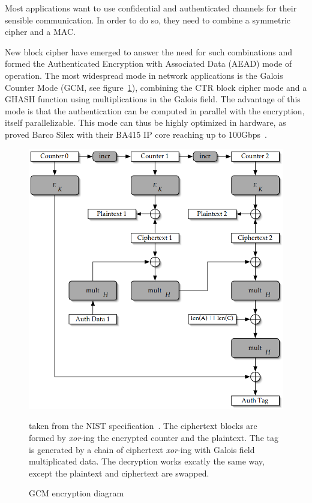 Most applications want to use confidential and authenticated channels for their sensible communication.
In order to do so, they need to combine a symmetric cipher and a MAC.

\noindent New block cipher have emerged to answer the need for such combinations and formed the Authenticated Encryption with Associated Data (AEAD) mode of operation.
The most widespread mode in network applications is the Galois Counter Mode (GCM, see figure~\ref{fig:gcm-encrypt}), combining the CTR block cipher mode and a GHASH function using multiplications in the Galois field.
The advantage of this mode is that the authentication can be computed in parallel with the encryption, itself parallelizable.
This mode can thus be highly optimized in hardware, as proved Barco Silex with their BA415 IP core reaching up to 100Gbps~\cite{barco-ba415}.

\begin{figure}
\includegraphics[width=\textwidth]{nist-gcm-encrypt}
\caption{GCM encryption diagram}{taken from the NIST specification~\cite{mcgrew2005}. The ciphertext blocks are formed by \textit{xor}-ing the encrypted counter and the plaintext. The tag is generated by a chain of ciphertext \textit{xor}-ing with Galois field multiplicated data. The decryption works excatly the same way, except the plaintext and ciphertext are swapped.}
\label{fig:gcm-encrypt}
\end{figure}









